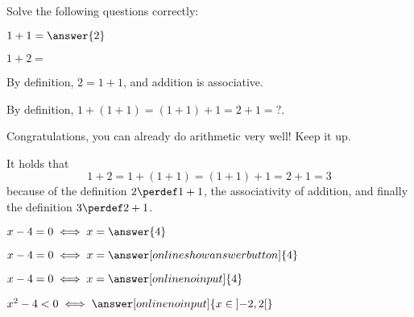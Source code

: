 \documentclass{ximera}
\begin{document}
    
    \displayOutcomes

    
    \begin{exercise} Solve the following questions correctly:
        \begin{question}
                $1+1 = \answer{2}$
        \end{question}    
        \begin{question}
            $1+2 = $ 
            \begin{hint}
                By definition, $2 = 1+1$, and addition is associative.
            \end{hint}
            \begin{hint}
                By definition, $1+(1+1) = (1+1) + 1 = 2 + 1 = ?$.
            \end{hint}
            \begin{feedback}[correct] 
                Congratulations, you can already do arithmetic very well! Keep it up. 
            \end{feedback}         
            \begin{oplossing} It holds that
                \[ 1 + 2 = 1 + (1 + 1) = (1 + 1) + 1 = 2 + 1 = 3 \]
                because of the definition $2\perdef 1+1$, the associativity of addition,
                and finally the definition $3\perdef 2+1$. 
            \end{oplossing}
        \end{question}

        \begin{question}$x-4 = 0
            \iff x = \answer{4}$
        \end{question}
        \begin{question}$x-4 = 0
            \iff x = \answer[onlineshowanswerbutton]{4}$
        \end{question}
        \begin{question}$x-4 = 0
            \iff x = \answer[onlinenoinput]{4}$
        \end{question}
        \begin{question}$x^2-4 < 0
            \iff \answer[onlinenoinput]{ x \in \left]-2,2\right[}$
        \end{question}

    \end{exercise}
\end{document}
